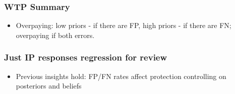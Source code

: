 \documentclass[11pt,hyperref={bookmarks=false}]{beamer}
\begin{document}
\begin{frame}
\frametitle{WTP Summary}
\begin{itemize}
\item Overpaying: low priors - if there are FP, high priors - if there are FN; overpaying if both errors. 
\end{itemize}
\vspace{20pt}

\end{frame}







\begin{frame}
\frametitle{Just IP responses regression for review}
\footnotesize
\begin{itemize}
\item Previous insights hold: FP/FN rates affect protection controlling on posteriors and beliefs
\end{itemize}

\begin{table}[htbp]\centering 
\caption{Informed Protection Response} 

\end{table}

\end{frame}
\end{document}
